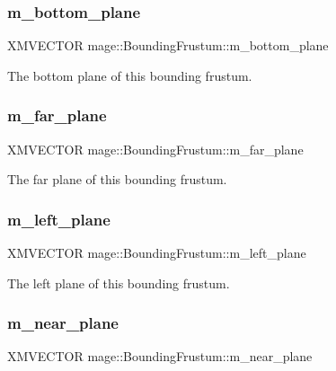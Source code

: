 \subsubsection{\texorpdfstring{m\+\_\+bottom\+\_\+plane}{m\_bottom\_plane}}
{\footnotesize\ttfamily X\+M\+V\+E\+C\+T\+OR mage\+::\+Bounding\+Frustum\+::m\+\_\+bottom\+\_\+plane}

The bottom plane of this bounding frustum. \hypertarget{classmage_1_1_bounding_frustum_a8a1841dcd6c7fdbecbd1dd5c39558e8e}{}\label{classmage_1_1_bounding_frustum_a8a1841dcd6c7fdbecbd1dd5c39558e8e} 
\subsubsection{\texorpdfstring{m\+\_\+far\+\_\+plane}{m\_far\_plane}}
{\footnotesize\ttfamily X\+M\+V\+E\+C\+T\+OR mage\+::\+Bounding\+Frustum\+::m\+\_\+far\+\_\+plane}

The far plane of this bounding frustum. \hypertarget{classmage_1_1_bounding_frustum_ae9ce2430295e49fe9dff4940fa9aafb1}{}\label{classmage_1_1_bounding_frustum_ae9ce2430295e49fe9dff4940fa9aafb1} 
\subsubsection{\texorpdfstring{m\+\_\+left\+\_\+plane}{m\_left\_plane}}
{\footnotesize\ttfamily X\+M\+V\+E\+C\+T\+OR mage\+::\+Bounding\+Frustum\+::m\+\_\+left\+\_\+plane}

The left plane of this bounding frustum. \hypertarget{classmage_1_1_bounding_frustum_abd4fa19a2fa0e88342ab4bc2726bf885}{}\label{classmage_1_1_bounding_frustum_abd4fa19a2fa0e88342ab4bc2726bf885} 
\subsubsection{\texorpdfstring{m\+\_\+near\+\_\+plane}{m\_near\_plane}}
{\footnotesize\ttfamily X\+M\+V\+E\+C\+T\+OR mage\+::\+Bounding\+Frustum\+::m\+\_\+near\+\_\+plane}

